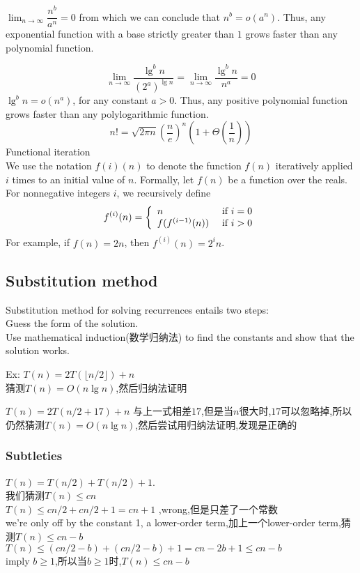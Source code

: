 \documentclass{article}
\begin{document}
$\lim_{n \to \infty} \dfrac{n^b}{a^n} = 0$
from which we can conclude that
$n^b = o(a^n)$.
Thus, any exponential function with a base strictly greater than $1$ grows faster than any polynomial function.

$$
\lim_{n \to \infty} \frac{\lg ^b n}{(2^a)^{\lg n}} = \lim_{n \to \infty}\frac{\lg ^b n}{n^a} = 0
$$
$\lg^bn = o(n^a)$,
for any constant $a > 0$. Thus, any positive polynomial function grows faster than any polylogarithmic function.
$$
n! = \sqrt{2\pi n} (\frac{n}{e})^n (1 + \Theta(\frac{1}{n}))
$$
Functional iteration\\
We use the notation $f(i)(n)$ to denote the function $f(n)$ iteratively applied $i$ times to an initial value of $n$. Formally, let $f(n)$ be a function over the reals. For nonnegative integers $i$, we recursively define
$$
f^{(i)}(n) =
\left\{
  \begin{array}{ll}
		  n & \textrm{\ if } i = 0\\
		  f(f^{(i-1)}(n)) & \textrm{\ if } i >0
  \end{array}
\right.
$$
For example, if $f(n) = 2n$, then $f^{(i)}(n) = 2^in$.

\subsection{Substitution method}
Substitution method for solving recurrences entails two steps:\\
Guess the form of the solution.\\
Use mathematical induction(数学归纳法) to find the constants and show that the solution works.

Ex:
$T(n) = 2T(\lfloor n/2 \rfloor) + n$\\
猜测$T(n) = O(n \lg n)$,然后归纳法证明

$T(n) = 2T(n/2 + 17) + n$
与上一式相差$17$,但是当$n$很大时,$17$可以忽略掉,所以仍然猜测$T(n) = O(n \lg n)$,然后尝试用归纳法证明,发现是正确的

\subsubsection{Subtleties}
$T(n) = T(n/2) + T(n/2) + 1$.\\
我们猜测$T(n) \leq cn$\\
$T(n) \leq c n/2 + c n/2 + 1 =cn + 1$ ,wrong,但是只差了一个常数\\
we're only off by the constant 1, a lower-order term,加上一个lower-order term,猜测$T(n) \leq cn - b$\\
$T(n) \leq (c n/2 - b) + (c n/2- b) + 1 = cn - 2b + 1 \leq cn - b$\\
imply $b \geq 1$,所以当$b \geq 1$时,$T(n) \leq cn - b$
\end{document}
